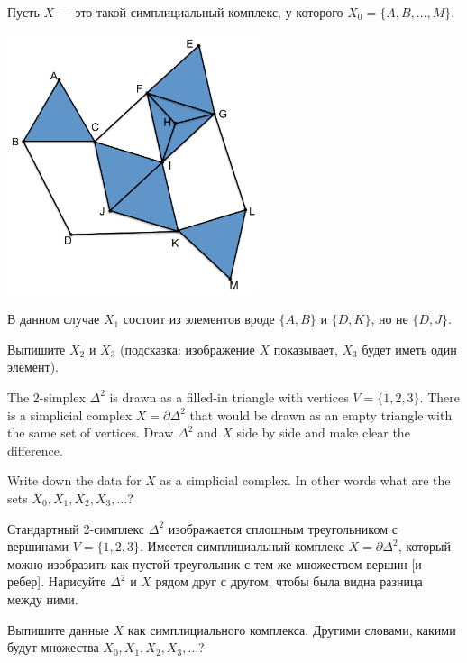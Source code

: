 \documentclass[CT4S-EN-RU]{subfiles}
\begin{document}
\begin{exerciseRUS}
Пусть $X$ — это такой симплициальный комплекс, у которого $X_0=\{A,B,\ldots,M\}$. 
\begin{center}
\includegraphics[height=3in]{OlogNetwork5}
\end{center} 
В данном случае $X_1$ состоит из элементов вроде $\{A,B\}$ и $\{D,K\}$, но не $\{D,J\}$. 

Выпишите $X_2$ и $X_3$ (подсказка: изображение $X$ показывает, $X_3$ будет иметь один элемент).
\end{exerciseRUS}

\begin{exerciseENG}
The 2-simplex $\Delta^2$ is drawn as a filled-in triangle with vertices $V=\{1,2,3\}$. There is a simplicial complex $X=\partial\Delta^2$ that would be drawn as an empty triangle with the same set of vertices. 
\sexc Draw $\Delta^2$ and $X$ side by side and make clear the difference.
\item Write down the data for $X$ as a simplicial complex. In other words what are the sets $X_0, X_1, X_2, X_3,\ldots$?
\endsexc
\end{exerciseENG}

\begin{exerciseRUS}
Стандартный 2-симплекс $\Delta^2$ изображается сплошным треугольником с вершинами $V=\{1,2,3\}$. Имеется симплициальный комплекс $X=\partial\Delta^2$, который можно изобразить как пустой треугольник с тем же множеством вершин [и ребер]. 
\sexc Нарисуйте $\Delta^2$ и $X$ рядом друг с другом, чтобы была видна разница между ними.
\item Выпишите данные $X$ как симплициального комплекса. Другими словами, какими будут множества $X_0, X_1, X_2, X_3,\ldots$?
\endsexc
\end{exerciseRUS}
\end{document}
